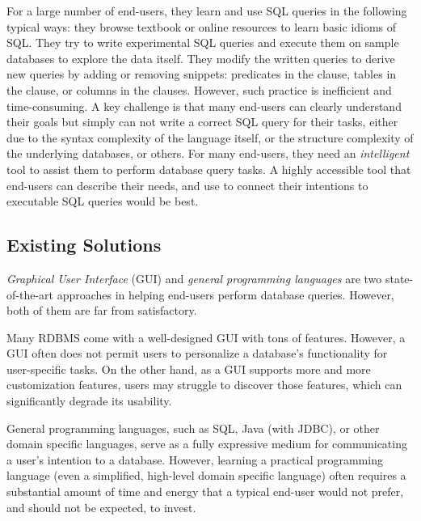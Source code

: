 For a large number of end-users, they learn and use SQL queries in
the following typical ways: they browse textbook or online resources to learn basic
idioms of SQL. They try to write experimental SQL queries and execute them
on sample databases to explore the data itself. They modify
the written queries to derive new queries by adding or removing snippets:
predicates in the  clause,
tables in the  clause, or columns in the  clauses.
However, such practice is inefficient and time-consuming.
A key challenge is that many end-users can clearly understand
their goals but simply can not write a correct SQL query for
their tasks, either due to the syntax complexity of the language itself,
or the structure complexity of the underlying databases, or others.
For many end-users, they need an \textit{intelligent} tool
to assist them to perform database query tasks. A highly accessible tool
that end-users can describe their needs, and use to connect their
intentions to executable
SQL queries would be best.


\subsection{Existing Solutions}


\textit{Graphical User Interface} (GUI) and \textit{general programming languages}
are two state-of-the-art approaches in helping end-users perform
database queries. However, both of them are far from satisfactory.

Many RDBMS come with a well-designed GUI with tons of features.
However, 
a GUI often does not permit users to personalize
a database's functionality for user-specific tasks. On the other hand,
as a GUI supports more and more customization features, users
may struggle to discover those features, which can significantly
degrade its usability. 

General programming languages, such as SQL,
Java (with JDBC), or other domain specific languages, 
serve as a fully expressive medium  for
communicating a user's intention to a database. However, learning
a practical programming language (even a simplified, high-level domain
specific language) often requires a substantial amount
of time and energy that a typical end-user would not prefer,
and should not be expected, to invest. 



